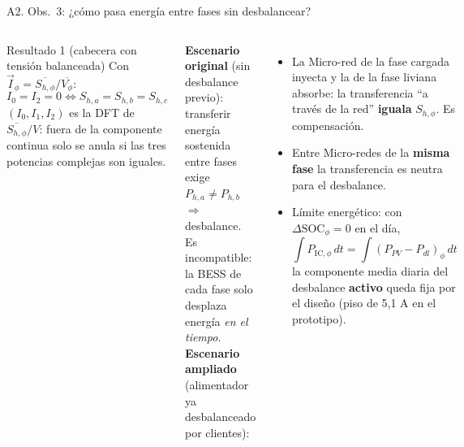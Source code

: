 \documentclass[aspectratio=169,10pt,t]{beamer}
\newcommand{\Pic}[1]{P_{\mathrm{IC},#1}}
\begin{document}
\begin{frame}{A2. Obs.\ 3: ¿cómo pasa energía entre fases sin desbalancear?}
  \begin{columns}[T,onlytextwidth]
    \begin{block}{Resultado 1 (cabecera con tensión balanceada)}
      \footnotesize Con $\vec I_\phi=\overline{S_{h,\phi}}/\overline{V_\phi}$:
      \[ I_0=I_2=0\iff S_{h,a}=S_{h,b}=S_{h,c} \]
      $(I_0,I_1,I_2)$ es la DFT de $\overline{S_{h,\phi}}/V$: fuera de la componente continua solo se anula si las tres potencias complejas son iguales.
    \end{block}
    \footnotesize
    \textbf{Escenario original} (sin desbalance previo): transferir energía sostenida entre fases exige $P_{h,a}\ne P_{h,b}$ $\Rightarrow$ desbalance. \alert{Es incompatible}: la BESS de cada fase solo desplaza energía \emph{en el tiempo}.
    \footnotesize
    \textbf{Escenario ampliado} (alimentador ya desbalanceado por clientes):
    \begin{itemize}\setlength\itemsep{2pt}
      \item La Micro-red de la fase cargada inyecta y la de la fase liviana absorbe: la transferencia ``a través de la red'' \textbf{iguala} $S_{h,\phi}$. Es compensación.
      \item Entre Micro-redes de la \textbf{misma fase} la transferencia es neutra para el desbalance.
      \item Límite energético: con $\Delta\mathrm{SOC}_\phi=0$ en el día,
      \[\textstyle\int\Pic{\phi}\,dt=\int(P_{PV}-P_{dl})_\phi\,dt\]
      la componente media diaria del desbalance \textbf{activo} queda fija por el diseño (piso de 5,1 A en el prototipo).
    \end{itemize}
  \end{columns}
\end{frame}
\end{document}
